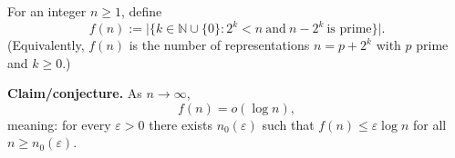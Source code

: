 For an integer $n\ge 1$, define
\[
  f(n) := \bigl|\{k\in\mathbb{N}\cup\{0\}: 2^k < n\ \text{and}\ n-2^k\ \text{is prime}\}\bigr|.
\]
(Equivalently, $f(n)$ is the number of representations $n=p+2^k$ with $p$ prime and $k\ge 0$.)

\textbf{Claim/conjecture.} As $n\to\infty$,
\[
  f(n) = o(\log n),
\]
meaning: for every $\varepsilon>0$ there exists $n_0(\varepsilon)$ such that $f(n)\le \varepsilon\log n$ for all $n\ge n_0(\varepsilon)$.

\item
